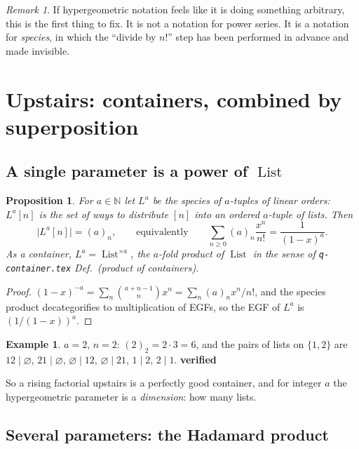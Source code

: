 \documentclass[11pt,a4paper]{article}
\newtheorem{proposition}[theorem]{Proposition}
\theoremstyle{definition}
\newtheorem{example}[theorem]{Example}
\theoremstyle{remark}
\newtheorem{remark}[theorem]{Remark}
\newcommand{\NN}{\mathbb{N}}
\newcommand{\norm}[1]{\lvert #1 \rvert}
\DeclareMathOperator{\List}{List}
\newcommand{\OK}{\textcolor{okgreen}{\textbf{verified}}}
\begin{document}
\begin{remark}\label{rem:struggle}
If hypergeometric notation feels like it is doing something arbitrary, this is the
first thing to fix. It is not a notation for power series. It is a notation for
\emph{species}, in which the ``divide by $n!$'' step has been performed in advance and
made invisible.
\end{remark}

\section{Upstairs: containers, combined by superposition}

\subsection{A single parameter is a power of $\List$}

\begin{proposition}\label{prop:pochlist}
For $a \in \NN$ let $L^a$ be the species of $a$-tuples of linear orders: $L^a[n]$ is
the set of ways to distribute $[n]$ into an ordered $a$-tuple of lists. Then
\[
  \norm{L^a[n]} = (a)_n,
  \qquad\text{equivalently}\qquad
  \sum_{n\ge0}(a)_n\frac{x^n}{n!} = \frac{1}{(1-x)^a} .
\]
As a container, $L^a = \List^{\times a}$, the $a$-fold product of $\List$ in the sense
of \texttt{q-container.tex} Def.~(product of containers).
\end{proposition}

\begin{proof}
$(1-x)^{-a} = \sum_n \binom{a+n-1}{n}x^n = \sum_n (a)_n x^n/n!$, and the species
product decategorifies to multiplication of EGFs, so the EGF of $L^a$ is
$(1/(1-x))^a$.
\end{proof}

\begin{example}\label{ex:a2n2}
$a = 2$, $n = 2$: $(2)_2 = 2\cdot3 = 6$, and the pairs of lists on $\{1,2\}$ are
$12\mid\varnothing$, $21\mid\varnothing$, $\varnothing\mid12$, $\varnothing\mid21$,
$1\mid2$, $2\mid1$. \OK
\end{example}

So a rising factorial upstairs is a perfectly good container, and for integer $a$ the
hypergeometric parameter is a \emph{dimension}: how many lists.

\subsection{Several parameters: the Hadamard product}
\end{document}
